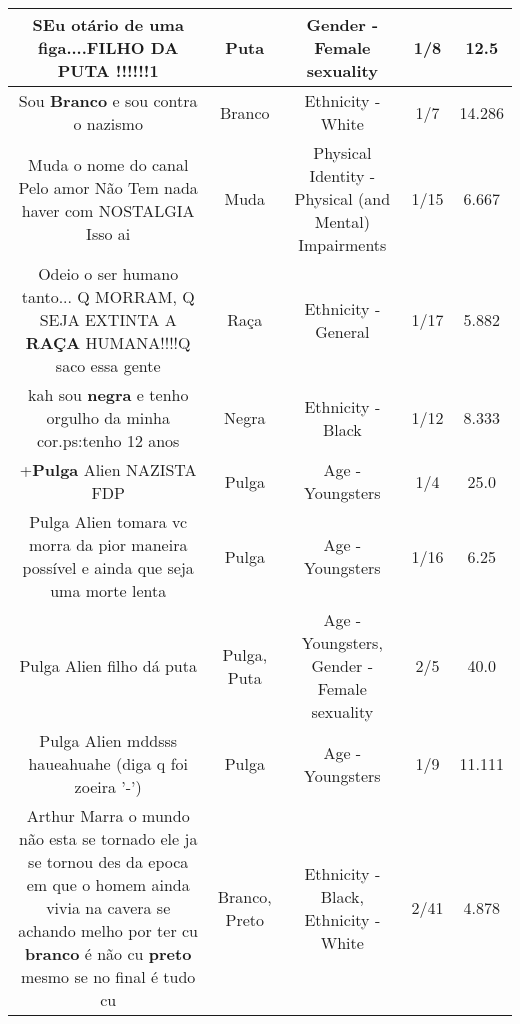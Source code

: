 \documentclass[11pt]{article}
\newlength\mylength
\begin{document}
\begin{center}
\begin{longtable}{|C{.65\mylength}|C{.30\mylength}|C{.12\mylength}|C{.12\mylength}|C{.12\mylength}|}
  \small SEu otário de uma figa....FILHO DA \textbf{PUTA} !!!!!!1\normalsize   & Puta & Gender - Female sexuality & 1/8 & 12.5 \\  \hline
  \small Sou \textbf{Branco} e sou contra o nazismo\normalsize   & Branco & Ethnicity - White & 1/7 & 14.286 \\  \hline
  \small Muda o nome do canal Pelo amor Não Tem nada haver com NOSTALGIA Isso ai\normalsize   & Muda & Physical Identity - Physical (and Mental) Impairments & 1/15 & 6.667 \\  \hline
  \small Odeio o ser humano tanto... Q MORRAM, Q SEJA EXTINTA A \textbf{RAÇA} HUMANA!!!!Q saco essa gente\normalsize   & Raça & Ethnicity - General & 1/17 & 5.882 \\  \hline
  \small kah sou \textbf{negra} e tenho orgulho da minha cor.ps:tenho 12 anos\normalsize   & Negra & Ethnicity - Black & 1/12 & 8.333 \\  \hline
  \small +\textbf{Pulga} Alien NAZISTA FDP\normalsize   & Pulga & Age - Youngsters & 1/4 & 25.0 \\  \hline
  \small Pulga Alien tomara vc morra da pior maneira possível e ainda que seja uma morte lenta\normalsize   & Pulga & Age - Youngsters & 1/16 & 6.25 \\  \hline
  \small Pulga Alien filho dá puta\normalsize   & Pulga, Puta & Age - Youngsters, Gender - Female sexuality & 2/5 & 40.0 \\  \hline
  \small Pulga Alien mddsss haueahuahe (diga q foi zoeira '-')\normalsize   & Pulga & Age - Youngsters & 1/9 & 11.111 \\  \hline
  \small Arthur Marra o mundo não esta se tornado ele ja se tornou des da epoca em que o homem  ainda vivia na cavera se achando melho por ter cu \textbf{branco} é não cu \textbf{preto} mesmo se no final é tudo cu\normalsize   & Branco, Preto & Ethnicity - Black, Ethnicity - White & 2/41 & 4.878 \\  \hline

\end{longtable}
\end{center}
\end{document}
